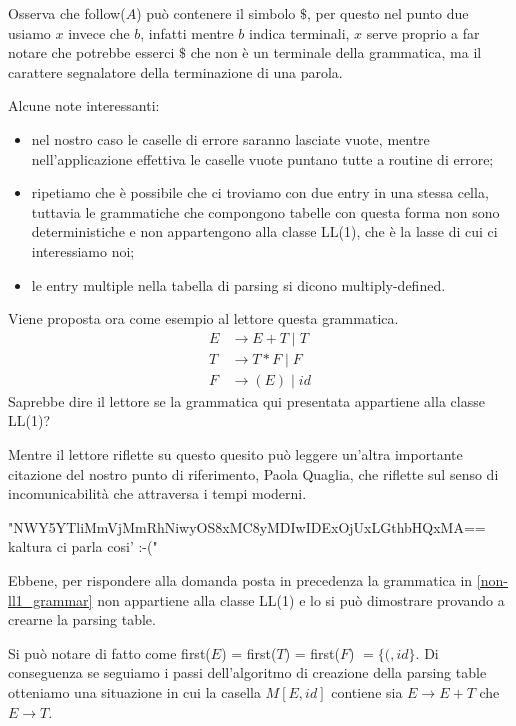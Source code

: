 \documentclass[class=book, crop=false, oneside, 12pt]{standalone}
\begin{document}
Osserva che follow(\(A\)) può contenere il simbolo \(\$\), per questo nel punto due usiamo \(x\) invece che \(b\), infatti mentre \(b\) indica terminali, \(x\) serve proprio a far notare che potrebbe esserci \(\$\) che non è un terminale della grammatica, ma il carattere segnalatore della terminazione di una parola.

Alcune note interessanti:
\begin{itemize}
    \item nel nostro caso le caselle di errore saranno lasciate vuote, mentre nell’applicazione effettiva le caselle vuote puntano tutte a routine di errore;
    \item ripetiamo che è possibile che ci troviamo con due entry in una stessa cella, tuttavia le grammatiche che compongono tabelle con questa forma non sono deterministiche e non appartengono alla classe LL(1), che è la lasse di cui ci interessiamo noi;
    \item le entry multiple nella tabella di parsing si dicono multiply-defined.
\end{itemize}

Viene proposta ora come esempio al lettore questa grammatica.
\begin{align}
    \label{non-ll1_grammar}
    E &\to E+T \mid T \\
    T &\to T*F \mid F \nonumber \\
    F &\to (E) \mid id \nonumber 
\end{align}
Saprebbe dire il lettore se la grammatica qui presentata appartiene alla classe LL(1)?

Mentre il lettore riflette su questo quesito può leggere un'altra importante citazione del nostro punto di riferimento, Paola Quaglia, che riflette sul senso di incomunicabilità che attraversa i tempi moderni.
\begin{displayquote}
    "NWY5YTliMmVjMmRhNiwyOS8xMC8yMDIwIDExOjUxLGthbHQxMA==  kaltura ci parla cosi' :-("
\end{displayquote}

Ebbene, per rispondere alla domanda posta in precedenza la grammatica in \ref{non-ll1_grammar} non appartiene alla classe LL(1) e lo si può dimostrare provando a crearne la parsing table.

Si può notare di fatto come first(\(E\)) = first(\(T\)) = first(\(F\)) \(= \{(, id\}\).
Di conseguenza se seguiamo i passi dell'algoritmo di creazione della parsing table otteniamo una situazione in cui la casella \(M[E, id]\) contiene sia \(E \to E+T\) che \(E \to T\).
\end{document}
